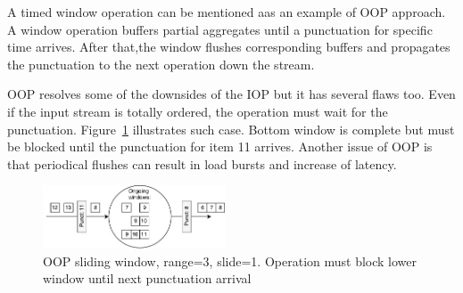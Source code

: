 A timed window operation can be mentioned   aas an example of OOP approach.  A window operation buffers partial aggregates until a punctuation for specific time arrives. After that,the  window flushes corresponding buffers and propagates the punctuation to the next operation down the stream.

OOP resolves some of the downsides of the IOP but it has several flaws too. Even if the input stream is totally ordered, the operation must wait for the punctuation. Figure~\ref{oop} illustrates such case. Bottom window is complete but must be blocked until the punctuation for item 11 arrives. Another issue of OOP is that periodical flushes can result in load bursts and increase of latency. 

\begin{figure}[htbp]
  \centering
  \includegraphics[width=0.48\textwidth]{pics/oop}
  \caption{OOP sliding window, range=3, slide=1. Operation must block lower window until next punctuation arrival }
  \label {oop}
\end{figure}
